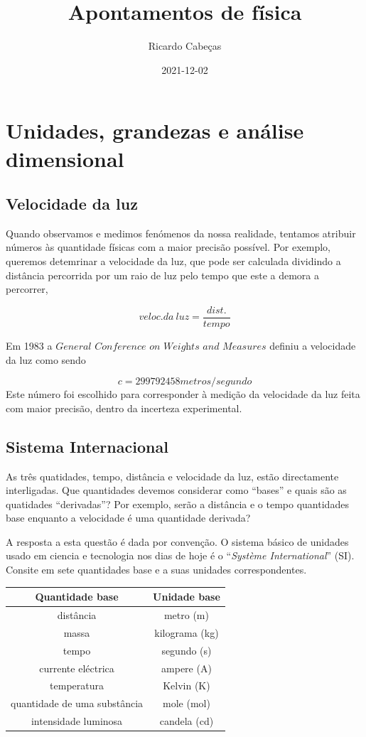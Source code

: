 \documentclass[
  portuguese,
  ]{book}
\title{Apontamentos de física}
\author{Ricardo Cabeças}
\date{2021-12-02}
\begin{document}
\maketitle

{
\setcounter{tocdepth}{1}
\tableofcontents
}
\hypertarget{unidades-grandezas-e-anuxe1lise-dimensional}{%
\chapter{Unidades, grandezas e análise dimensional}\label{unidades-grandezas-e-anuxe1lise-dimensional}}

\hypertarget{velocidade-da-luz}{%
\section{Velocidade da luz}\label{velocidade-da-luz}}

Quando observamos e medimos fenómenos da nossa realidade, tentamos atribuir números às quantidade físicas com a maior precisão possível. Por exemplo, queremos detemrinar a velocidade da luz, que pode ser calculada dividindo a distância percorrida por um raio de luz pelo tempo que este a demora a percorrer,

\[veloc.da\ luz=\frac{dist.}{tempo}\]

Em 1983 a \(\textit{General Conference on Weights and Measures}\) definiu a velocidade da luz como sendo

\[c=299792458metros/segundo\]
Este número foi escolhido para corresponder à medição da velocidade da luz feita com maior precisão, dentro da incerteza experimental.

\hypertarget{sistema-internacional}{%
\section{Sistema Internacional}\label{sistema-internacional}}

As três quatidades, tempo, distância e velocidade da luz, estão directamente interligadas. Que quantidades devemos considerar como ``bases'' e quais são as quatidades ``derivadas''? Por exemplo, serão a distância e o tempo quantidades base enquanto a velocidade é uma quantidade derivada?

A resposta a esta questão é dada por convenção. O sistema básico de unidades usado em ciencia e tecnologia nos dias de hoje é o ``\emph{Système International}'' (SI). Consite em sete quantidades base e a suas unidades correspondentes.

\begin{longtable}[]{@{}cc@{}}
\toprule
Quantidade base & Unidade base\tabularnewline
\midrule
\endhead
distância & metro (m)\tabularnewline
massa & kilograma (kg)\tabularnewline
tempo & segundo (s)\tabularnewline
currente eléctrica & ampere (A)\tabularnewline
temperatura & Kelvin (K)\tabularnewline
quantidade de uma substância & mole (mol)\tabularnewline
intensidade luminosa & candela (cd)\tabularnewline
\bottomrule
\end{longtable}
\end{document}
